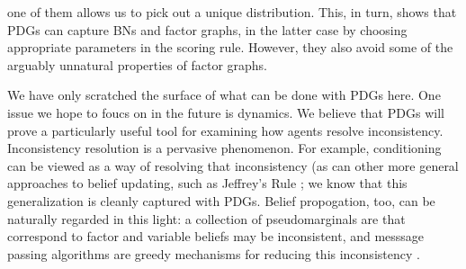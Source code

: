 \documentclass[letterpaper]{article} %
\theoremstyle{plain}
\theoremstyle{definition}
\theoremstyle{remark}
\begin{document}
\begin{itemize}
one of them allows us to pick out a unique distribution.
This, in turn, shows that PDGs
%
can capture BNs and factor graphs, in the latter case by choosing 
appropriate parameters in the scoring rule. However, they also avoid
some of the arguably unnatural properties of factor graphs.
\end{itemize}

We have only scratched the surface of what can be done with PDGs here. 
%
One issue we hope to foucs on in the future is dynamics.  We believe
that PDGs will prove a particularly useful tool for examining how agents resolve
inconsistency.
Inconsistency resolution is a pervasive phenomenon.
For example, 
conditioning can be
viewed as a way of resolving that inconsistency (as can other more
general approaches to belief updating, such as Jeffrey's Rule
\cite{Jeffrey68};
we know that this generalization is cleanly captured with PDGs. 
Belief propogation, too, 
can be naturally regarded in this light: a collection of pseudomarginals are
that correspond to factor and variable beliefs may be inconsistent, and 
messsage passing algorithms are greedy mechanisms for reducing this inconsistency \cite{wainwright2008graphical}.
\end{document}

